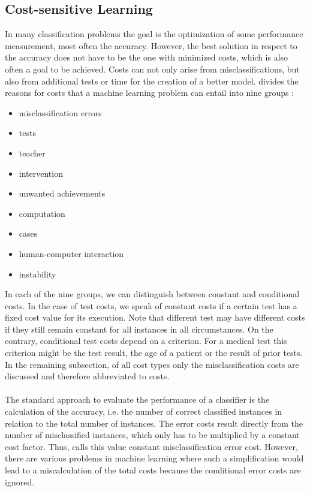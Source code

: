 \documentclass[article,type=msc,colorback,accentcolor=tud7b]{tudthesis}
\begin{document}
  \subsection{Cost-sensitive Learning}
  \label{subsec:cost_sensitive_learning}
    In many classification problems the goal is the optimization of some performance measurement, most often the accuracy. However, the best solution in respect to the accuracy does not have to be the one with minimized costs, which is also often a goal to be achieved. Costs can not only arise from misclassifications, but also from additional tests or time for the creation of a better model. \citeauthor{Turney2002} divides the reasons for costs that a machine learning problem can entail into nine groups \autocite{Turney2002}:
    \begin{itemize}[noitemsep]
      \item misclassification errors
      \item tests
      \item teacher
      \item intervention
      \item unwanted achievements
      \item computation
      \item cases
      \item human-computer interaction
      \item instability
    \end{itemize}
    In each of the nine groups, we can distinguish between constant and conditional costs. In the case of test costs, we speak of constant costs if a certain test has a fixed cost value for its execution. Note that different test may have different costs if they still remain constant for all instances in all circumstances. On the contrary, conditional test costs depend on a criterion. For a medical test this criterion might be the test result, the age of a patient or the result of prior tests. In the remaining subsection, of all cost types only the misclassification costs are discussed and therefore abbreviated to costs. \\\\
    The standard approach to evaluate the performance of a classifier is the calculation of the accuracy, i.e. the number of correct classified instances in relation to the total number of instances. The error costs result directly from the number of misclassified instances, which only has to be multiplied by a constant cost factor. Thus, \citeauthor{Turney2002} calls this value constant misclassification error cost. However, there are various problems in machine learning where such a simplification would lead to a miscalculation of the total costs because the conditional error costs are ignored. \\\\
\end{document}
